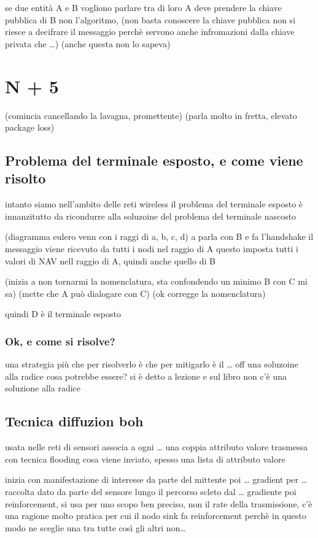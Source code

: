 \documentclass[11pt]{article}
\begin{document}
se due entità A e B vogliono parlare tra di loro A deve prendere la chiave pubblica di B
non l'algoritmo,
(non basta conoscere la chiave pubblica non si riesce a decifrare il messaggio perchè servono anche infromazioni dalla chiave privata che \ldots{})
(anche questa non lo sapeva)

\section{N + 5}
\label{sec:org8ebfb59}
(comincia cancellando la lavagna, promettente)
(parla molto in fretta, elevato package loss)
\subsection{Problema del terminale esposto, e come viene risolto}
\label{sec:orgb6282a2}
intanto siamo nell'ambito delle reti wireless
il problema del terminale esposto è innanzitutto da ricondurre alla soluzoine del problema del terminale nascosto

(diagramma eulero venn con i raggi di a, b, c, d)
a parla con B e fa l'handshake
il messaggio viene ricevuto da tutti i nodi nel raggio di A
questo imposta tutti i valori di NAV nell raggio di A, quindi anche quello di B

(inizia a non tornarmi la nomenclatura, sta confondendo un minimo B con C mi sa)
(mette che A può dialogare con C)
(ok corregge la nomenclatura)

quindi D è il terminale esposto

\subsubsection{Ok, e come si risolve?}
\label{sec:org2593333}
una strategia più che per risolverlo è che per mitigarlo è il \ldots{} off
una soluzoine alla radice cosa potrebbe essere? si è detto a lezione e sul libro
non c'è una soluzione alla radice

\subsection{Tecnica diffuzion boh}
\label{sec:org72fcea8}
usata nelle reti di sensori
associa a ogni \ldots{} una coppia attributo valore
trasmessa con tecnica flooding
cosa viene inviato, spesso una lista di attributo valore

inizia con manifestazione di interesse da parte del mittente
poi \ldots{} gradient per \ldots{}
raccolta dato da parte del sensore lungo il percorso scleto dal \ldots{} gradiente
poi reinforcement, si usa per uno scopo ben preciso, non il rate della trasmissione, c'è una ragione molto pratica per cui il nodo sink fa reinforcement
perchè in questo modo ne sceglie una tra tutte così gli altri non\ldots{}
\end{document}
